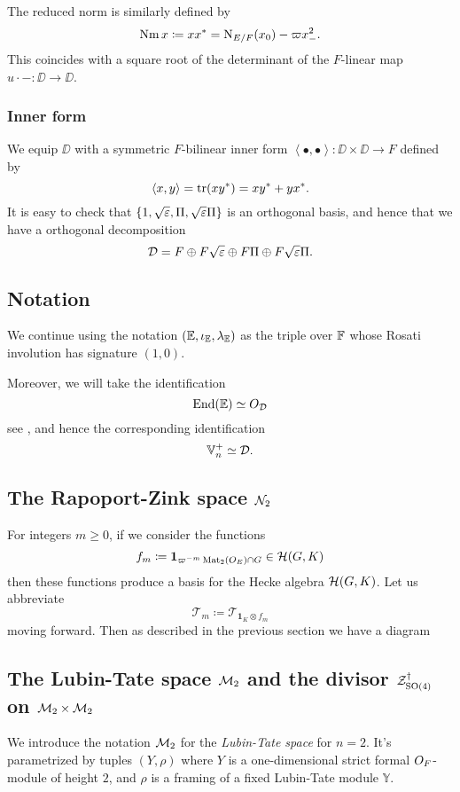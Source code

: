 The reduced norm is similarly defined by
\[ \operatorname{Nm} x \coloneqq x x^\ast = \operatorname{N}_{E/F}(x_0) - \varpi x_-^2. \]
This coincides with a square root of
the determinant of the $F$-linear map $u \cdot - \colon \DD \to \DD$.

\subsubsection{Inner form}
We equip $\DD$ with a symmetric $F$-bilinear inner form
$\left\langle \bullet, \bullet \right\rangle \colon \DD \times \DD \to F$ defined by
\[ \left\langle x,y \right\rangle = \operatorname{tr}(xy^\ast) = xy^\ast + yx^\ast. \]
It is easy to check that $\{1, \sqrt{\varepsilon}, \Pi, \sqrt{\varepsilon}\Pi\}$ is an orthogonal basis,
and hence that we have a orthogonal decomposition
\[ \mathcal D = F \oplus F\sqrt{\varepsilon}  \oplus F \Pi \oplus F\sqrt{\varepsilon}\Pi. \]

\subsection{Notation}
We continue using the notation $(\mathbb E, \iota_\mathbb E, \lambda_\mathbb E)$ as the triple over $\mathbb F$
whose Rosati involution has signature $(1,0)$.

Moreover, we will take the identification
\[ \operatorname{End}(\mathbb E) \simeq O_\mathcal D \]
see \cite[Remark 2.5]{ref:KR},
and hence the corresponding identification
\[ \mathbb V_n^+ \simeq \mathcal D. \]

\subsection{The Rapoport-Zink space $\mathcal N_2$}
For integers $m \ge 0$, if we consider the functions
\[ f_m \coloneqq \mathbf{1}_{\varpi^{-m} \operatorname{Mat}_2(O_E) \cap G} \in \mathcal H(G, K) \]
then these functions produce a basis for the Hecke algebra $\mathcal H(G, K)$.
Let us abbreviate
\[ \mathcal{T}_m \coloneqq \mathcal{T}_{\mathbf{1}_K \otimes f_m} \]
moving forward.
Then as described in the previous section we have a diagram
\begin{center}
\end{center}

\subsection{The Lubin-Tate space $\mathcal M_2$ and the divisor $\mathcal Z^{\dagger}_{\operatorname{SO}(4)}$ on $\mathcal M_2 \times \mathcal M_2$}
We introduce the notation $\mathcal M_2$ for the \emph{Lubin-Tate space} for $n = 2$.
It's parametrized by tuples $(Y, \rho)$
where $Y$ is a one-dimensional strict formal $O_F$-module of height $2$,
and $\rho$ is a framing of a fixed Lubin-Tate module $\mathbb{Y}$.

